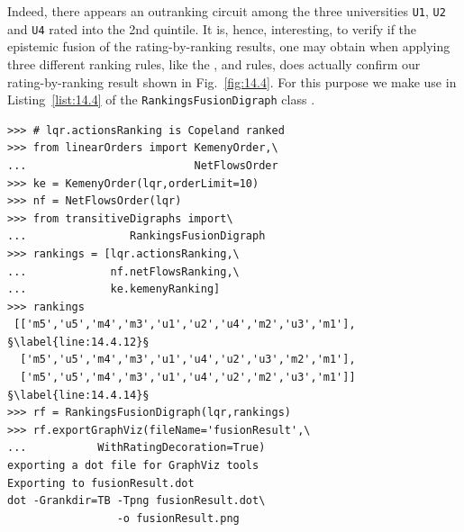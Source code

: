 Indeed, there appears an outranking circuit among the three universities \texttt{U1}, \texttt{U2} and \texttt{U4} rated into the 2nd quintile. It is, hence, interesting, to verify if the epistemic fusion of the rating-by-ranking results, one may obtain when applying three different ranking rules, like the \Kemeny, \Copeland and \NetFlows rules, does actually confirm our rating-by-ranking result shown in Fig.~\vref{fig:14.4}. For this purpose we make use in Listing~\vref{list:14.4} of the \texttt{RankingsFusionDigraph} class .
\begin{lstlisting}[caption={Computing the epistemic fusion of three rating-by-rankig results},label=list:14.4]
>>> # lqr.actionsRanking is Copeland ranked
>>> from linearOrders import KemenyOrder,\
...                          NetFlowsOrder
>>> ke = KemenyOrder(lqr,orderLimit=10)
>>> nf = NetFlowsOrder(lqr)
>>> from transitiveDigraphs import\
...                RankingsFusionDigraph
>>> rankings = [lqr.actionsRanking,\
...             nf.netFlowsRanking,\
...             ke.kemenyRanking]
>>> rankings
 [['m5','u5','m4','m3','u1','u2','u4','m2','u3','m1'], §\label{line:14.4.12}§
  ['m5','u5','m4','m3','u1','u4','u2','u3','m2','m1'],
  ['m5','u5','m4','m3','u1','u4','u2','m2','u3','m1']] §\label{line:14.4.14}§
>>> rf = RankingsFusionDigraph(lqr,rankings)
>>> rf.exportGraphViz(fileName='fusionResult',\
...           WithRatingDecoration=True)
exporting a dot file for GraphViz tools
Exporting to fusionResult.dot
dot -Grankdir=TB -Tpng fusionResult.dot\
                 -o fusionResult.png
\end{lstlisting}
